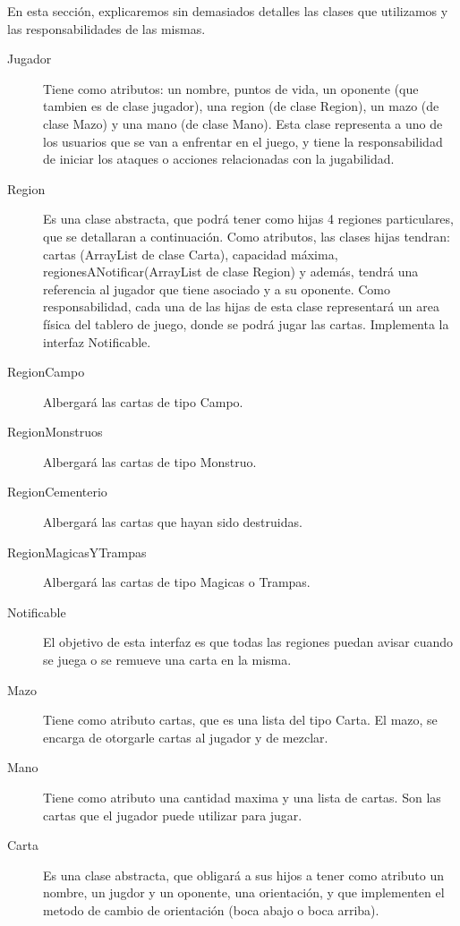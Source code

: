	
En esta sección, explicaremos sin demasiados detalles las clases que utilizamos y las responsabilidades de las mismas.


\begin{description}

\item[Jugador] Tiene como atributos: un nombre, puntos de vida, un oponente (que tambien es de clase jugador), una region (de clase Region), un mazo (de clase Mazo) y una mano (de clase Mano). Esta clase representa a uno de los usuarios que se van a enfrentar en el juego, y tiene la responsabilidad de iniciar los ataques o acciones relacionadas con la jugabilidad.

\item[Region] Es una clase abstracta, que podrá tener como hijas 4 regiones particulares, que se detallaran a continuación. Como atributos, las clases hijas tendran: cartas (ArrayList de clase Carta), capacidad máxima, regionesANotificar(ArrayList de clase Region) y además, tendrá una referencia al jugador que tiene asociado y a su oponente. Como responsabilidad, cada una de las hijas de esta clase representará un area física del tablero de juego, donde se podrá jugar las cartas. Implementa la interfaz Notificable.

\item[RegionCampo] Albergará las cartas de tipo Campo.

\item[RegionMonstruos] Albergará las cartas de tipo Monstruo.

\item[RegionCementerio] Albergará las cartas que hayan sido destruidas.

\item[RegionMagicasYTrampas] Albergará las cartas de tipo Magicas o Trampas.

\item[Notificable] El objetivo de esta interfaz es que todas las regiones puedan avisar cuando se juega o se remueve una carta en la misma.

\item[Mazo] Tiene como atributo cartas, que es una lista del tipo Carta. El mazo, se encarga de otorgarle cartas al jugador y de mezclar.

\item[Mano] Tiene como atributo una cantidad maxima y una lista de cartas. Son las cartas que el jugador puede utilizar para jugar.

\item[Carta] Es una clase abstracta, que obligará a sus hijos a tener como atributo un nombre, un jugdor y un oponente, una orientación,  y que implementen el metodo de cambio de orientación (boca abajo o boca arriba).


\end{description}
